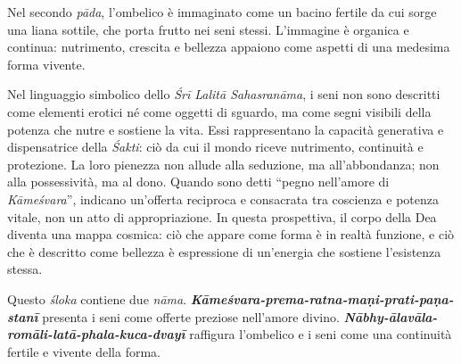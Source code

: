 Nel secondo \textit{pāda}, l’ombelico è immaginato come un bacino fertile da cui sorge una liana sottile, che porta frutto nei seni stessi. L’immagine è organica e continua: nutrimento, crescita e bellezza appaiono come aspetti di una medesima forma vivente.

Nel linguaggio simbolico dello \textit{Śrī Lalitā Sahasranāma}, i seni non sono descritti come elementi erotici né come oggetti di sguardo, ma come segni visibili della potenza che nutre e sostiene la vita. Essi rappresentano la capacità generativa e dispensatrice della \textit{Śakti}: ciò da cui il mondo riceve nutrimento, continuità e protezione. La loro pienezza non allude alla seduzione, ma all’abbondanza; non alla possessività, ma al dono. Quando sono detti “pegno nell’amore di \textit{Kāmeśvara}”, indicano un’offerta reciproca e consacrata tra coscienza e potenza vitale, non un atto di appropriazione. In questa prospettiva, il corpo della Dea diventa una mappa cosmica: ciò che appare come forma è in realtà funzione, e ciò che è descritto come bellezza è espressione di un’energia che sostiene l’esistenza stessa.


Questo \textit{śloka} contiene due \textit{nāma}.  
\textbf{\textit{Kāmeśvara-prema-ratna-maṇi-prati-paṇa-stanī}} presenta i seni come offerte preziose nell’amore divino.  
\textbf{\textit{Nābhy-ālavāla-romāli-latā-phala-kuca-dvayī}} raffigura l’ombelico e i seni come una continuità fertile e vivente della forma.
